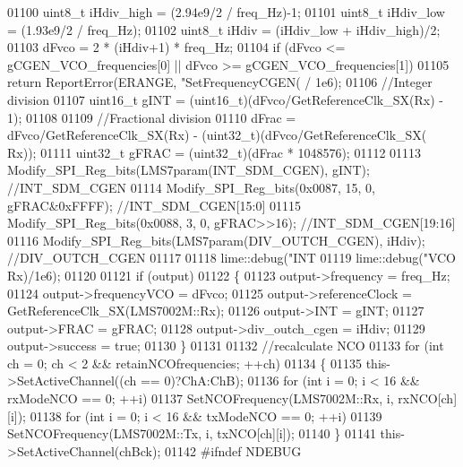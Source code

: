 \begin{DoxyCode}
{{{{{{{{{{{{{{{{{{{{{{{{{01100     uint8\_t iHdiv\_high = (2.94e9/2 / freq\_Hz)-1;
01101     uint8\_t iHdiv\_low = (1.93e9/2 / freq\_Hz);
01102     uint8\_t iHdiv = (iHdiv\_low + iHdiv\_high)/2;
01103     dFvco = 2 * (iHdiv+1) * freq\_Hz;
01104     \textcolor{keywordflow}{if} (dFvco <= gCGEN_VCO_frequencies[0] || dFvco >= gCGEN_VCO_frequencies[1])
01105         \textcolor{keywordflow}{return} ReportError(ERANGE, \textcolor{stringliteral}{"SetFrequencyCGEN(%
       / 1e6);
01106     \textcolor{comment}{//Integer division}
01107     uint16\_t gINT = (uint16\_t)(dFvco/GetReferenceClk_SX(Rx) - 1);
01108 
01109     \textcolor{comment}{//Fractional division}
01110     dFrac = dFvco/GetReferenceClk_SX(Rx) - (uint32\_t)(dFvco/GetReferenceClk_SX(
      Rx));
01111     uint32\_t gFRAC = (uint32\_t)(dFrac * 1048576);
01112 
01113     Modify_SPI_Reg_bits(LMS7param(INT_SDM_CGEN), gINT); \textcolor{comment}{//INT\_SDM\_CGEN}
01114     Modify_SPI_Reg_bits(0x0087, 15, 0, gFRAC&0xFFFF); \textcolor{comment}{//INT\_SDM\_CGEN[15:0]}
01115     Modify_SPI_Reg_bits(0x0088, 3, 0, gFRAC>>16); \textcolor{comment}{//INT\_SDM\_CGEN[19:16]}
01116     Modify_SPI_Reg_bits(LMS7param(DIV_OUTCH_CGEN), iHdiv); \textcolor{comment}{//DIV\_OUTCH\_CGEN}
01117 
01118     lime::debug(\textcolor{stringliteral}{"INT %
01119     lime::debug(\textcolor{stringliteral}{"VCO %
      Rx)/1e6);
01120 
01121     \textcolor{keywordflow}{if} (output)
01122     \{
01123         output->frequency = freq\_Hz;
01124         output->frequencyVCO = dFvco;
01125         output->referenceClock = GetReferenceClk_SX(LMS7002M::Rx);
01126         output->INT = gINT;
01127         output->FRAC = gFRAC;
01128         output->div_outch_cgen = iHdiv;
01129         output->success = \textcolor{keyword}{true};
01130     \}
01131 
01132     \textcolor{comment}{//recalculate NCO}
01133     \textcolor{keywordflow}{for} (\textcolor{keywordtype}{int} ch = 0; ch < 2 && retainNCOfrequencies; ++ch)
01134     \{
01135         this->SetActiveChannel((ch == 0)?ChA:ChB);
01136         \textcolor{keywordflow}{for} (\textcolor{keywordtype}{int} i = 0; i < 16 && rxModeNCO == 0; ++i)
01137             SetNCOFrequency(LMS7002M::Rx, i, rxNCO[ch][i]);
01138         \textcolor{keywordflow}{for} (\textcolor{keywordtype}{int} i = 0; i < 16 && txModeNCO == 0; ++i)
01139             SetNCOFrequency(LMS7002M::Tx, i, txNCO[ch][i]);
01140     \}
01141     this->SetActiveChannel(chBck);
01142 \textcolor{preprocessor}{#ifndef NDEBUG}
}}}}}}}}}}}}}}}}}}}}}}}}}}}}
\end{DoxyCode}
